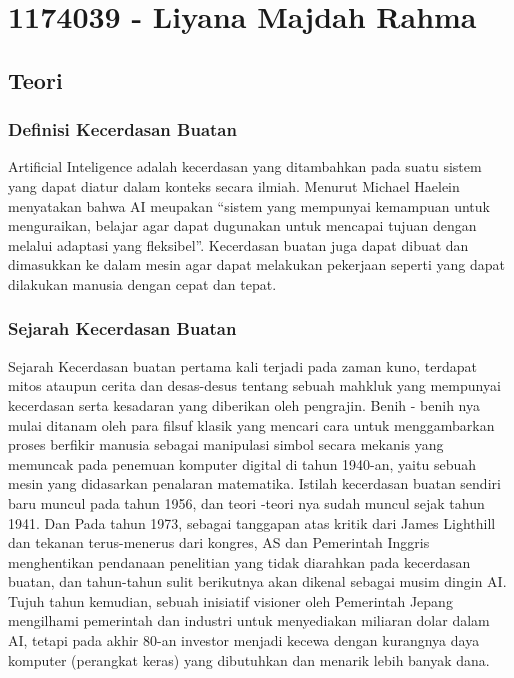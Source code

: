 \section{1174039 - Liyana Majdah Rahma}
        \subsection{Teori}
            \subsubsection{Definisi Kecerdasan Buatan}

            Artificial Inteligence adalah kecerdasan yang ditambahkan  pada suatu sistem yang dapat diatur dalam konteks secara ilmiah. Menurut Michael Haelein menyatakan bahwa  AI meupakan “sistem yang mempunyai kemampuan untuk menguraikan, belajar agar dapat dugunakan untuk mencapai tujuan dengan melalui adaptasi yang fleksibel”. Kecerdasan buatan juga dapat dibuat dan dimasukkan ke dalam mesin agar dapat melakukan pekerjaan seperti yang dapat dilakukan manusia dengan cepat dan tepat. 
            
            \subsubsection{Sejarah Kecerdasan Buatan}

            Sejarah Kecerdasan buatan pertama kali terjadi pada zaman kuno, terdapat mitos ataupun cerita dan desas-desus tentang sebuah mahkluk yang mempunyai kecerdasan serta kesadaran yang diberikan oleh pengrajin. Benih - benih nya mulai ditanam oleh para filsuf klasik yang mencari cara untuk menggambarkan proses berfikir manusia sebagai manipulasi simbol secara mekanis yang memuncak pada penemuan komputer digital di tahun 1940-an, yaitu sebuah mesin yang didasarkan penalaran matematika. Istilah kecerdasan buatan sendiri baru muncul pada tahun 1956, dan teori -teori nya sudah muncul sejak tahun 1941. Dan Pada tahun 1973, sebagai tanggapan atas kritik dari James Lighthill dan tekanan terus-menerus dari kongres, AS dan Pemerintah Inggris menghentikan pendanaan penelitian yang tidak diarahkan pada kecerdasan buatan, dan tahun-tahun sulit berikutnya akan dikenal sebagai musim dingin AI. Tujuh tahun kemudian, sebuah inisiatif visioner oleh Pemerintah Jepang mengilhami pemerintah dan industri untuk menyediakan miliaran dolar dalam AI, tetapi pada akhir 80-an investor menjadi kecewa dengan kurangnya daya komputer (perangkat keras) yang dibutuhkan dan menarik lebih banyak dana.

